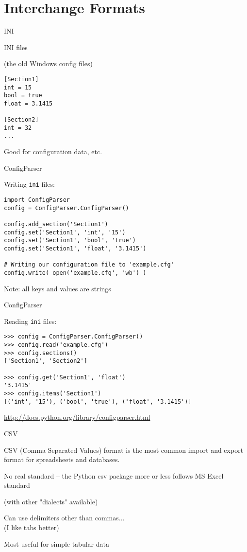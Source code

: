\documentclass{beamer}
\begin{document}
\section{Interchange Formats} 

\begin{frame}[fragile]{INI}

{\Large INI files}

(the old Windows config files)

\begin{verbatim}
[Section1]
int = 15
bool = true
float = 3.1415

[Section2]
int = 32
...
\end{verbatim}
\vfill
{\Large Good for configuration data, etc.}
\end{frame}

\begin{frame}[fragile]{ConfigParser}

{\Large Writing \verb|ini| files:}

\begin{verbatim}
import ConfigParser
config = ConfigParser.ConfigParser()

config.add_section('Section1')
config.set('Section1', 'int', '15')
config.set('Section1', 'bool', 'true')
config.set('Section1', 'float', '3.1415')

# Writing our configuration file to 'example.cfg'
config.write( open('example.cfg', 'wb') )
\end{verbatim}

\vfill
Note: all keys and values are strings
\end{frame}

\begin{frame}[fragile]{ConfigParser}

{\Large Reading \verb|ini| files:}

\begin{verbatim}
>>> config = ConfigParser.ConfigParser()
>>> config.read('example.cfg')
>>> config.sections()
['Section1', 'Section2']

>>> config.get('Section1', 'float')
'3.1415'
>>> config.items('Section1')
[('int', '15'), ('bool', 'true'), ('float', '3.1415')]
\end{verbatim}

\vfill
\url{http://docs.python.org/library/configparser.html}
\end{frame}

\begin{frame}[fragile]{CSV}

{\Large CSV (Comma Separated Values) format is the
most common import and export format for spreadsheets and databases.}

\vfill
{\Large No real standard -- the Python csv package more or less follows MS Excel standard}

(with other "dialects" available)

\vfill
{\Large Can use delimiters other than commas...}\\
(I like tabs better)

\vfill
{\Large Most useful for simple tabular data}

\end{frame}
\end{document}
